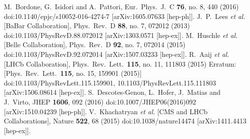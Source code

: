 \documentclass[12pt]{article}
\begin{document}
\begin{thebibliography}{9}
  M.~Bordone, G.~Isidori and A.~Pattori,
  Eur.\ Phys.\ J.\ C {\bf 76}, no. 8, 440 (2016)
  doi:10.1140/epjc/s10052-016-4274-7
  [arXiv:1605.07633 [hep-ph]].
  J.~P.~Lees {\it et al.} [BaBar Collaboration],
  Phys.\ Rev.\ D {\bf 88}, no. 7, 072012 (2013)
  doi:10.1103/PhysRevD.88.072012
  [arXiv:1303.0571 [hep-ex]].
  M.~Huschle {\it et al.} [Belle Collaboration],
  Phys.\ Rev.\ D {\bf 92}, no. 7, 072014 (2015)
  doi:10.1103/PhysRevD.92.072014
  [arXiv:1507.03233 [hep-ex]].
  R.~Aaij {\it et al.} [LHCb Collaboration],
  Phys.\ Rev.\ Lett.\  {\bf 115}, no. 11, 111803 (2015)
  Erratum: [Phys.\ Rev.\ Lett.\  {\bf 115}, no. 15, 159901 (2015)]
  doi:10.1103/PhysRevLett.115.159901, 10.1103/PhysRevLett.115.111803
  [arXiv:1506.08614 [hep-ex]].
  S.~Descotes-Genon, L.~Hofer, J.~Matias and J.~Virto,
  JHEP {\bf 1606}, 092 (2016)
  doi:10.1007/JHEP06(2016)092
  [arXiv:1510.04239 [hep-ph]].
  V.~Khachatryan {\it et al.} [CMS and LHCb Collaborations],
  Nature {\bf 522}, 68 (2015)
  doi:10.1038/nature14474
  [arXiv:1411.4413 [hep-ex]].
\end{thebibliography}
\newpage
\end{document}
